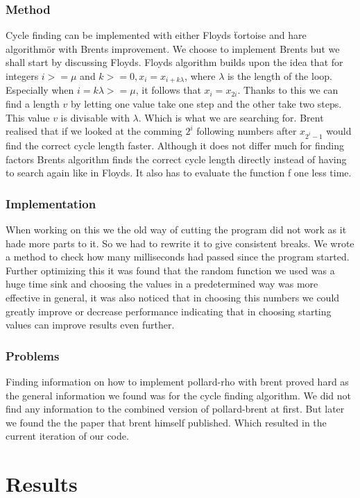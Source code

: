 \documentclass[a4paper, 12pt]{report}
\begin{document}
\subsection{Method}
Cycle finding can be implemented with either Floyds \"tortoise and hare algorithm\" or with Brents improvement. We choose to implement Brents but we shall start by discussing Floyds. Floyds algorithm builds upon the idea that for integers $i >= \mu$ and $k >= 0, x_i = x_{i + k\lambda}$, where $\lambda$ is the length of the loop. Especially when $i = k\lambda >= \mu$, it follows that $x_i = x_{2i}$. Thanks to this we can find a length $v$ by letting one value take one step and the other take two steps. This value $v$ is divisable with $\lambda$. Which is what we are searching for. Brent realised that if we looked at the comming $2^i$ following numbers after $x_{2^i-1}$ would find the correct cycle length faster. Although it does not differ much for finding factors Brents algorithm finds the correct cycle length directly instead of having to search again like in Floyds. It also has to evaluate the function f one less time.

\subsection{Implementation}
When working on this we the old way of cutting the program did not work as it hade more parts to it. So we had to rewrite it to give consistent breaks. We wrote a method to check how many milliseconds had passed since the program started. Further optimizing this it was found that the random function we used was a huge time sink and choosing the values in a predetermined way was more effective in general, it was also noticed that in choosing this numbers we could greatly improve or decrease performance indicating that in choosing starting values can improve results even further.

\subsection{Problems}
Finding information on how to implement pollard-rho with brent proved hard as the general information we found was for the cycle finding algorithm. We did not find any information to the combined version of pollard-brent at first. But later we found the the paper that brent himself published. Which resulted in the current iteration of our code\cite{brentpdf}.
\chapter{Results}
\end{document}
